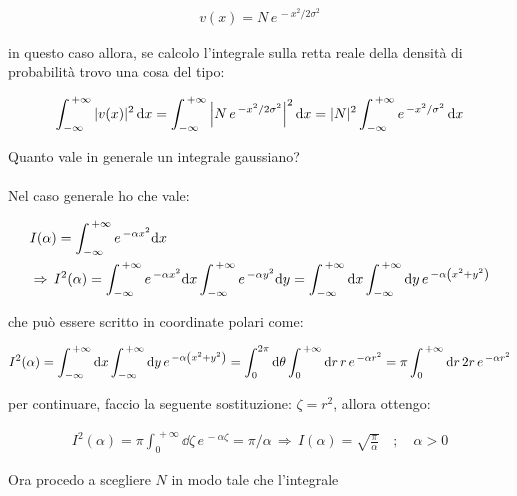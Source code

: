 \begin{align*}
	v(x) = N \, e^{\, - x^2 / 2\sigma^2}
\end{align*}

	in questo caso allora, se calcolo l'integrale sulla retta reale della densità di probabilità trovo una cosa del tipo:
	
\begin{align*}
	\int_{-\infty}^{\, + \infty} |v(x)|^2 \, \dd x = \int_{-\infty}^{\, + \infty} \abs{N \, e^{\, - x^2 / 2\sigma^2}}^2 \, \dd x = |N|^2 \int_{-\infty}^{\, + \infty} e^{\, - x^2 / \sigma^2} \, \dd x
\end{align*}

\begin{myapprf}
	
	Quanto vale in generale un integrale gaussiano?
	\\
	\\
	Nel caso generale ho che vale:
	
\begin{align*}
	& I(\alpha) = \int_{-\infty}^{\, + \infty} e^{\, - \alpha x^2} \dd x \\
	& \Rightarrow \, I^2(\alpha) = \int_{-\infty}^{\, + \infty} e^{\, - \alpha x^2} \dd x \int_{-\infty}^{\, + \infty} e^{\, - \alpha y^2} \dd y = \int_{-\infty}^{\, + \infty} \dd x \int_{-\infty}^{\, + \infty} \dd y \, e^{\, - \alpha\qty(x^2+y^2)}
\end{align*}
	
	che può essere scritto in coordinate polari come:
	
\begin{align*}
	I^2(\alpha) = \int_{-\infty}^{\, + \infty} \dd x \int_{-\infty}^{\, + \infty} \dd y \, e^{\, - \alpha\qty(x^2+y^2)} = \int_{0}^{2\pi} \dd \theta \int_{0}^{\, + \infty} \dd r \, r \, e^{\, - \alpha r^2} = \pi \int_0^{\, +\infty} \dd r \, 2r \, e^{\, - \alpha r^2} 
\end{align*}

	per continuare, faccio la seguente sostituzione: $\zeta = r^2$, allora ottengo:
	
\begin{align*}
	I^2(\alpha) = \pi \int_0^{\, +\infty} \dd \zeta \, e^{\, -\alpha \zeta} = \pi/\alpha \, \Rightarrow \, I(\alpha) = \sqrt{\frac{\pi}{\alpha}} \quad ; \quad \alpha > 0
\end{align*}

\end{myapprf}
	
	Ora procedo a scegliere $N$ in modo tale che l'integrale 

